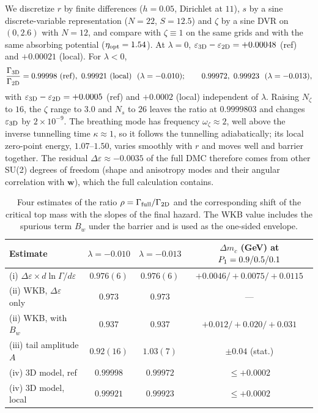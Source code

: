 We discretize $r$ by finite differences ($h=0.05$, Dirichlet at $11$), $s$ by a sine discrete-variable representation ($N=22$, $S=12.5$) and $\zeta$ by a sine DVR on $(0,2.6)$ with $N=12$, and compare with $\zeta\equiv1$ on the same grids and with the same absorbing potential ($\eta_{\rm opt}=1.54$). %
At $\lambda=0$, $\varepsilon_{\rm 3D}-\varepsilon_{\rm 2D}=+0.00048$ (ref) and $+0.00021$ (local). %
For $\lambda<0$,
\begin{equation}
\frac{\Gamma_{\rm 3D}}{\Gamma_{\rm 2D}}=0.99998\ \text{(ref)},\ 0.99921\ \text{(local)}\ \ (\lambda=-0.010);\qquad 0.99972,\ 0.99923\ \ (\lambda=-0.013),
\label{eq:v18-3d}
\end{equation}
with $\varepsilon_{\rm 3D}-\varepsilon_{\rm 2D}=+0.0005$ (ref) and $+0.0002$ (local) independent of $\lambda$. %
Raising $N_\zeta$ to $16$, the $\zeta$ range to $3.0$ and $N_s$ to $26$ leaves the ratio at $0.9999803$ and changes $\varepsilon_{\rm 3D}$ by $2\times10^{-9}$. %
The breathing mode has frequency $\omega_\zeta\approx2$, well above the inverse tunnelling time $\kappa\approx1$, so it follows the tunnelling adiabatically; its local zero-point energy, $1.07$--$1.50$, varies smoothly with $r$ and moves well and barrier together. %
The residual $\Delta\varepsilon\approx-0.0035$ of the full DMC therefore comes from other SU(2) degrees of freedom (shape and anisotropy modes and their angular correlation with $\bm w$), which the full calculation contains.

\begin{table}[t]
\centering
\caption{Four estimates of the ratio $\rho=\Gamma_{\rm full}/\Gamma_{\rm 2D}$ and the corresponding shift of the critical top mass with the slopes of the final hazard. The WKB value includes the spurious term $B_w$ under the barrier and is used as the one-sided envelope.}
\label{tab:v18-four}
\small
\begin{tabular}{@{}lccc@{}}
\toprule
Estimate & $\lambda=-0.010$ & $\lambda=-0.013$ & $\Delta m_c$ (GeV) at $P_1=0.9/\allowbreak 0.5/\allowbreak 0.1$ \\
\midrule
(i) $\Delta\varepsilon\times d\ln\Gamma/d\varepsilon$ & $0.976(6)$ & $0.976(6)$ & $+0.0046/\allowbreak{+}0.0075/\allowbreak{+}0.0115$ \\ %
(ii) WKB, $\Delta\varepsilon$ only & $0.973$ & $0.973$ & --- \\ %
(ii) WKB, with $B_w$ & $0.937$ & $0.937$ & $+0.012/\allowbreak{+}0.020/\allowbreak{+}0.031$ \\ %
(iii) tail amplitude $A$ & $0.92(16)$ & $1.03(7)$ & $\pm0.04$ (stat.) \\ %
(iv) 3D model, ref & $0.99998$ & $0.99972$ & $\le+0.0002$ \\ %
(iv) 3D model, local & $0.99921$ & $0.99923$ & $\le+0.0002$ \\ %
\bottomrule
\end{tabular}
\end{table}


